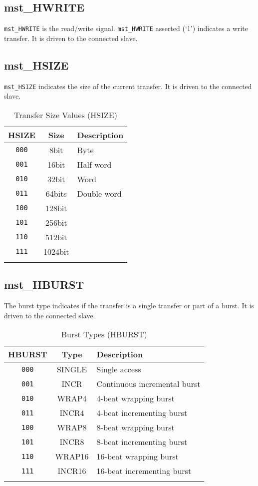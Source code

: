 \subsection{mst\_HWRITE}\label{mst_hwrite}

\texttt{mst\_HWRITE} is the read/write signal. \texttt{mst\_HWRITE} asserted (`1') indicates a
write transfer. It is driven to the connected slave.

\subsection{mst\_HSIZE}\label{mst_hsize}

\texttt{mst\_HSIZE} indicates the size of the current transfer. It is driven to
the connected slave.

\begin{longtable}[]{@{}ccl@{}}
\toprule
HSIZE & Size & Description\tabularnewline
\midrule
\endhead
\texttt{000} & 8bit    & Byte\tabularnewline
\texttt{001} & 16bit   & Half word\tabularnewline
\texttt{010} & 32bit   & Word\tabularnewline
\texttt{011} & 64bits  & Double word\tabularnewline
\texttt{100} & 128bit  & \tabularnewline
\texttt{101} & 256bit  & \tabularnewline
\texttt{110} & 512bit  & \tabularnewline
\texttt{111} & 1024bit & \tabularnewline
\bottomrule
\caption{Transfer Size Values (HSIZE)}
\end{longtable}


\subsection{mst\_HBURST}\label{mst_hburst}

The burst type indicates if the transfer is a single transfer or part of
a burst. It is driven to the connected slave.

\begin{longtable}[]{@{}ccl@{}}
\toprule
HBURST & Type & Description\tabularnewline
\midrule
\endhead
\texttt{000} & SINGLE & Single access\tabularnewline
\texttt{001} & INCR & Continuous incremental burst\tabularnewline
\texttt{010} & WRAP4 & 4-beat wrapping burst\tabularnewline
\texttt{011} & INCR4 & 4-beat incrementing burst\tabularnewline
\texttt{100} & WRAP8 & 8-beat wrapping burst\tabularnewline
\texttt{101} & INCR8 & 8-beat incrementing burst\tabularnewline
\texttt{110} & WRAP16 & 16-beat wrapping burst\tabularnewline
\texttt{111} & INCR16 & 16-beat incrementing burst\tabularnewline
\bottomrule
\caption{Burst Types (HBURST)}
\end{longtable}

